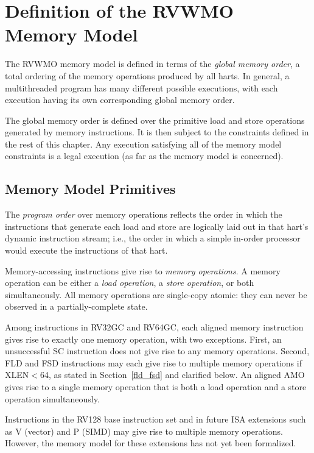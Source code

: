 \section{Definition of the RVWMO Memory Model}
\label{sec:rvwmo}

The RVWMO memory model is defined in terms of the {\em global memory order}, a total ordering of the memory operations produced by all harts.
In general, a multithreaded program has many different possible executions, with each execution having its own corresponding global memory order.

The global memory order is defined over the primitive load and store operations generated by memory instructions.
It is then subject to the constraints defined in the rest of this chapter.
Any execution satisfying all of the memory model constraints is a legal execution (as far as the memory model is concerned).

\subsection*{Memory Model Primitives}
\label{sec:rvwmo:primitives}
The {\em program order} over memory operations reflects the order in which the instructions that generate each load and store are logically laid out in that hart's dynamic instruction stream; i.e., the order in which a simple in-order processor would execute the instructions of that hart.

Memory-accessing instructions give rise to {\em memory operations}.
A memory operation can be either a {\em load operation}, a {\em store operation}, or both simultaneously.
All memory operations are single-copy atomic: they can never be observed in a partially-complete state.

Among instructions in RV32GC and RV64GC, each aligned memory instruction gives rise to exactly one memory operation, with two exceptions.
First, an unsuccessful SC instruction does not give rise to any memory operations.
Second, FLD and FSD instructions may each give rise to multiple memory operations if XLEN$<$64, as stated in Section~\ref{fld_fsd} and clarified below.
An aligned AMO gives rise to a single memory operation that is both a load operation and a store operation simultaneously.

\begin{commentary}
  Instructions in the RV128 base instruction set and in future ISA extensions such as V (vector) and P (SIMD) may give rise to multiple memory operations.  However, the memory model for these extensions has not yet been formalized.
\end{commentary}

